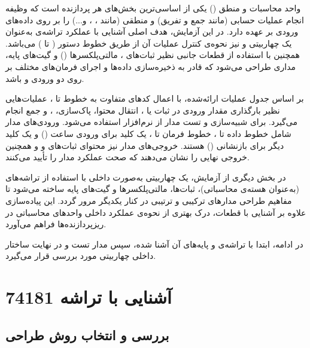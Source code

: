 \documentclass[a4paper,12pt]{article}
\numberwithin{figure}{subsection}
\begin{document}
واحد محاسبات و منطق () یکی از اساسی‌ترین بخش‌های هر پردازنده است که وظیفه انجام عملیات حسابی (مانند جمع و تفریق) و منطقی (مانند ، ،  و...) را بر روی داده‌های ورودی بر عهده دارد. در این آزمایش، هدف اصلی آشنایی با عملکرد تراشه‌ی  به‌عنوان یک  چهاربیتی و نیز نحوه‌ی کنترل عملیات آن از طریق خطوط دستور ( تا ) می‌باشد. همچنین با استفاده از قطعات جانبی نظیر ثبات‌های ، مالتی‌پلکسرها () و گیت‌های پایه، مداری طراحی می‌شود که قادر به ذخیره‌سازی داده‌ها و اجرای فرمان‌های مختلف بر روی دو ورودی  و  باشد.

بر اساس جدول عملیات ارائه‌شده، با اعمال کدهای متفاوت به خطوط  تا ، عملیات‌هایی نظیر بارگذاری مقدار ورودی در ثبات  یا ، انتقال محتوا، پاک‌سازی، ،  و جمع انجام می‌گیرد. برای شبیه‌سازی و تست مدار از نرم‌افزار  استفاده می‌شود. ورودی‌های مدار شامل خطوط داده  تا ، خطوط فرمان  تا ، یک کلید  برای ورودی ساعت () و یک کلید دیگر برای بازنشانی () هستند. خروجی‌های مدار نیز محتوای ثبات‌های  و  و همچنین خروجی نهایی  را نشان می‌دهند که صحت عملکرد مدار را تأیید می‌کنند.

در بخش دیگری از آزمایش، یک  چهاربیتی به‌صورت داخلی با استفاده از تراشه‌های  (به‌عنوان هسته‌ی محاسباتی)، ثبات‌ها، مالتی‌پلکسرها و گیت‌های پایه ساخته می‌شود تا مفاهیم طراحی مدارهای ترکیبی و ترتیبی در کنار یکدیگر مرور گردد. این پیاده‌سازی علاوه بر آشنایی با قطعات، درک بهتری از نحوه‌ی عملکرد داخلی واحدهای محاسباتی در ریزپردازنده‌ها فراهم می‌آورد.

در ادامه، ابتدا با تراشه‌ی  و پایه‌های آن آشنا شده، سپس مدار تست و در نهایت ساختار داخلی  چهاربیتی مورد بررسی قرار می‌گیرد.


\newpage

\section{آشنایی با تراشه 74181}
\leavevmode\par
\vspace{0.5cm}


\subsection{بررسی و انتخاب روش طراحی}
\leavevmode\par
\vspace{0.3cm}
\end{document}

